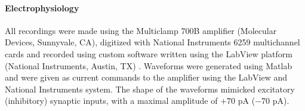 \paragraph{Electrophysiology}

All recordings were made using the Multiclamp 700B amplifier (Molecular Devices, Sunnyvale, CA), digitized with National Instruments 6259 multichannel cards and recorded using custom software written using the LabView platform (National Instruments, Austin, TX) .  Waveforms were generated using Matlab and were given as current commands to the amplifier using the LabView and National Instruments system. The shape of the waveforms mimicked excitatory (inhibitory) synaptic inputs, with a maximal amplitude of $+70$ pA ($-70$ pA).